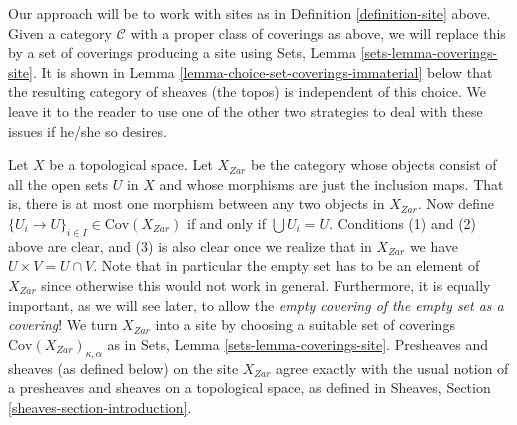 \begin{remark}
\medskip\noindent
Our approach will be to work with sites as in Definition \ref{definition-site}
above. Given a category $\mathcal{C}$ with a proper class of coverings
as above, we will replace this by a set of coverings producing a site using
Sets, Lemma \ref{sets-lemma-coverings-site}. It is shown in
Lemma \ref{lemma-choice-set-coverings-immaterial} below that the resulting
category of sheaves (the topos) is independent of this choice. We leave it to
the reader to use one of the other two strategies to deal with these issues if
he/she so desires.
\end{remark}

\begin{example}
\label{example-site-topological}
Let $X$ be a topological space. Let $X_{Zar}$ be the category whose
objects consist of all the open sets $U$ in $X$ and whose morphisms
are just the inclusion maps. That is, there is at most one morphism
between any two objects in $X_{Zar}$. Now define
$\{U_i \to U\}_{i \in I}\in \text{Cov}(X_{Zar})$ if
and only if $\bigcup U_i = U$.
Conditions (1) and (2) above are clear, and (3) is also
clear once we realize that in $X_{Zar}$ we have
$U \times V = U \cap V$. Note that in particular the empty
set has to be an element of $X_{Zar}$ since otherwise
this would not work in general. Furthermore, it is equally important,
as we will see later, to allow the {\it empty covering of the empty
set as a covering}!
We turn $X_{Zar}$ into a site
by choosing a suitable set of coverings
$\text{Cov}(X_{Zar})_{\kappa, \alpha}$ as in
Sets, Lemma \ref{sets-lemma-coverings-site}.
Presheaves and sheaves (as defined below)
on the site $X_{Zar}$ agree exactly with the usual notion of
a presheaves and sheaves on a topological space, as defined
in Sheaves, Section \ref{sheaves-section-introduction}.
\end{example}

